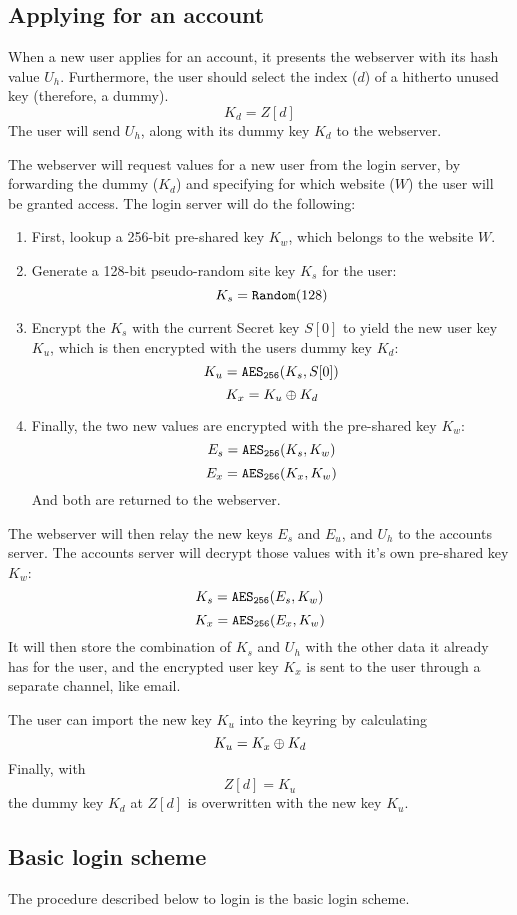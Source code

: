 \subsection{Applying for an account}
\label{sec:applying}
When a new user applies for an account,
it presents the webserver with its hash value $U_h$.
Furthermore,
the user should select the index ($d$) of a hitherto unused key
(therefore, a dummy).
\[K_d=Z[d]\]
The user will send $U_h$, along with its dummy key $K_d$ to the webserver.
\par
The webserver will request values for a new user from the login server,
by forwarding the dummy ($K_d$) and
specifying for which website ($W$) the user will be granted access.
The login server will do the following:
\begin{enumerate}
\item First,
	lookup a 256-bit pre-shared key $K_w$,
	which belongs to the website $W$.
\item Generate a 128-bit pseudo-random site key $K_s$ for the user:
\[K_s=\texttt{Random}(128)\]
\item Encrypt the $K_s$ with the current Secret key $S[0]$ to yield the new user key $K_u$,
which is then encrypted with the users dummy key $K_d$:
\[K_u=\texttt{\ensuremath{\mathtt{AES_{256}}}}(K_s, S[0])\]
\[K_x=K_u\oplus K_d\]
\item Finally, the two new values are encrypted with the pre-shared key $K_w$:
\[E_s=\texttt{\ensuremath{\mathtt{AES_{256}}}}(K_s, K_w)\]
\[E_x=\texttt{\ensuremath{\mathtt{AES_{256}}}}(K_x, K_w)\]
And both are returned to the webserver.
\end{enumerate}
The webserver will then relay the new keys $E_s$ and $E_u$, and $U_h$ to the accounts server.
The accounts server will decrypt those values with it's own pre-shared key $K_w$:
\[K_s=\texttt{\ensuremath{\mathtt{AES_{256}}}}(E_s, K_w)\]
\[K_x=\texttt{\ensuremath{\mathtt{AES_{256}}}}(E_x, K_w)\]
It will then store the combination of $K_s$ and $U_h$ with the other data it already has for the user,
and the encrypted user key $K_x$ is sent to the user through a separate channel,
like email.
\par
The user can import the new key $K_u$ into the keyring by calculating
\[K_u=K_x\oplus K_d\]
Finally, with
\[Z[d]=K_u\]
the dummy key $K_d$ at $Z[d]$ is overwritten with the new key $K_u$.

\subsection{Basic login scheme}
The procedure described below to login is the basic login scheme.


